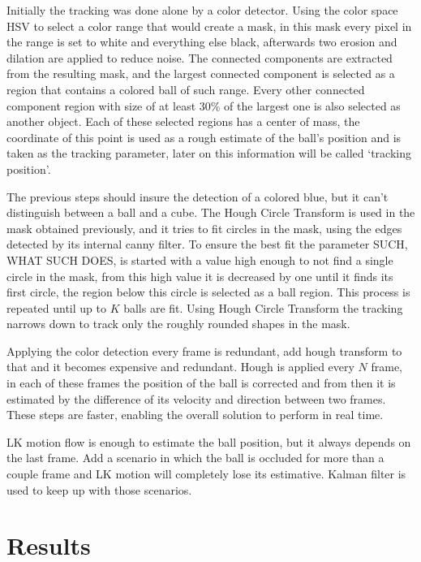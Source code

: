 \documentclass[10pt,twocolumn,letterpaper]{article}
\begin{document}
  Initially the tracking was done alone by a color detector. Using the color
  space HSV to select a color range that would create a mask, in this mask every
  pixel in the range is set to white and everything else black, afterwards two
  erosion and dilation are applied to reduce noise. The connected components
  are extracted from the resulting mask, and the largest connected component is
  selected as a region that contains a colored ball of such range. Every other
  connected component region with size of at least 30\% of the largest one is
  also selected as another object. Each of these selected regions has a center
  of mass, the coordinate of this point is used as a rough estimate of
  the ball's position and is taken as the tracking parameter, later on this
  information will be called `tracking position'.

  The previous steps should insure the detection of a colored blue, but it can't
  distinguish between a ball and a cube. The Hough Circle Transform is used in
  the mask obtained previously, and it tries to fit circles in the mask, using
  the edges detected by its internal canny filter. To ensure the best fit the
  parameter SUCH, WHAT SUCH DOES, is started with a value high enough to not
  find a single circle in the mask, from this high value it is decreased by one
  until it finds its first circle, the region below this circle is selected as a
  ball region. This process is repeated until up to $K$ balls are fit. Using
  Hough Circle Transform the tracking narrows down to track only the roughly
  rounded shapes in the mask.

  Applying the color detection every frame is redundant, add hough transform to
  that and it becomes expensive and redundant. Hough is applied every $N$ frame,
  in each of these frames the position of the ball is corrected and from then it
  is estimated by the difference of its velocity and direction between two
  frames. These steps are faster, enabling the overall solution to perform in
  real time.

  LK motion flow is enough to estimate the ball position, but it always depends
  on the last frame. Add a scenario in which the ball is occluded for more than
  a couple frame and LK motion will completely lose its estimative. Kalman
  filter is used to keep up with those scenarios.

\section{Results}
\end{document}
